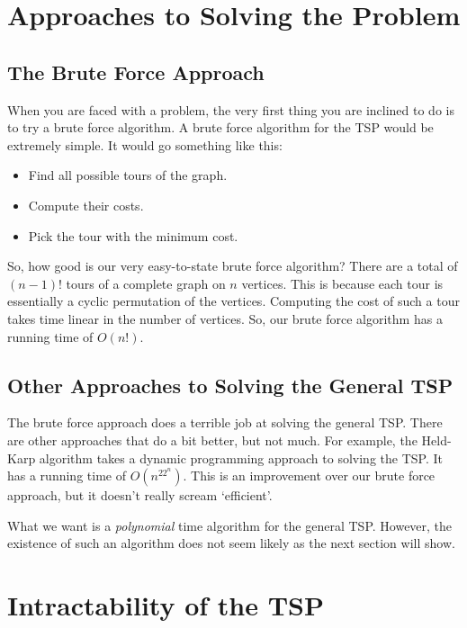 \documentclass[12pt]{article}
\begin{document}
\section{Approaches to Solving the Problem}

\subsection{The Brute Force Approach}

When you are faced with a problem, the very first thing you are inclined to do is to try a brute force algorithm. A brute force algorithm for the TSP would be extremely simple. It would go something like this:

\begin{itemize}
    \item Find all possible tours of the graph. 
    \item Compute their costs.
    \item Pick the tour with the minimum cost.
\end{itemize}

So, how good is our very easy-to-state brute force algorithm? There are a total of \((n-1)!\) tours of a complete graph on \(n\) vertices. This is because each tour is essentially a cyclic permutation of the vertices. Computing the cost of such a tour takes time linear in the number of vertices. So, our brute force algorithm has a running time of \(O(n!)\).


\subsection{Other Approaches to Solving the General TSP}

The brute force approach does a terrible job at solving the general TSP. There are other approaches that do a bit better, but not much. For example, the Held-Karp algorithm takes a dynamic programming approach to solving the TSP. It has a running time of \(O(n^22^n)\). This is an improvement over our brute force approach, but it doesn't really scream `efficient'.

What we want is a \textit{polynomial} time algorithm for the general TSP. However, the existence of such an algorithm does not seem likely as the next section will show.

\section{Intractability of the TSP}
\end{document}
